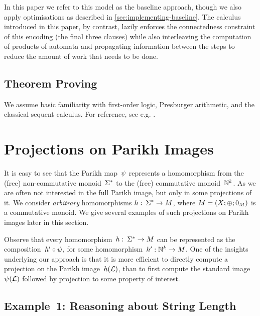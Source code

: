 \documentclass[acmsmall,review,anonymous,screen]{acmart}\settopmatter{printfolios=true,printccs=true,printacmref=true}
\theoremstyle{definition}
\begin{document}
In this paper we refer to this model as the baseline approach, though we also
apply optimisations as described in \cref{sec:implementing-baseline}. The
calculus introduced in this paper, by contrast, lazily enforces the
connectedness constraint of this encoding (the final three clauses) while also
interleaving the computation of products of automata and propagating information
between the steps to reduce the amount of work that needs to be done.
  
\subsection{Theorem Proving}

We assume basic familiarity with first-order logic, Presburger
arithmetic, and the classical sequent calculus. For reference, see
e.g. \cite{Fitting96a}.

\section{Projections on Parikh Images}\label{sec:generalised}

It is easy to see that the Parikh map~$\operatorname{\psi}$ represents a
homomorphism from the (free) non-commutative monoid~$\Sigma^*$ to the
(free) commutative monoid~$\mathbb{N}^k$. As we are often not
interested in the full Parikh image, but only in some projections of
it. We consider \emph{arbitrary} homomorphisms
$h:\: \Sigma^* \to M$, where
$M = \left(X;\operatorname{\oplus};0_{M}\right)$ is a commutative
monoid. We give several
examples of such projections on Parikh images later in this section.

Observe that every homomorphism~$h:\: \Sigma^* \to M$ can be
represented as the composition~$h' \circ \operatorname{\psi}$, for some
homomorphism~$h' : \mathbb{N}^k \to M$. One of the insights underlying our
approach is that it is more efficient to directly compute a
projection on the Parikh image~$h(\operatorname{\mathcal{L}})$, than to first compute the
standard image~$\operatorname{\psi}(\operatorname{\mathcal{L}})$ followed by projection to
some property of interest.


\subsection{Example~1: Reasoning about String Length}
\end{document}
